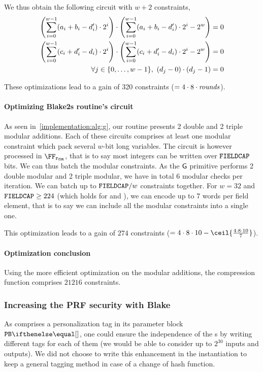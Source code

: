 We thus obtain the following circuit with $w+2$ constraints,
\begin{align*}
  \left ( \sum_{i=0}^{w - 1} ( a_i + b_i - d'_i ) \cdot 2^i \right ) \cdot \left ( \sum_{i=0}^{w - 1} ( a_i + b_i - d'_i ) \cdot 2^i - 2^w \right ) &= 0 \\
  \left ( \sum_{i=0}^{w - 1} ( c_i + d'_i - d_i ) \cdot 2^i \right ) \cdot \left ( \sum_{i=0}^{w - 1} ( c_i + d'_i - d_i ) \cdot 2^i - 2^w \right ) &= 0 \\
  \forall j \in \{{0},\ldots,{w - 1}\},\ (d_j - 0) \cdot (d_j - 1 ) &= 0
\end{align*}

These optimizations lead to a gain of 320 constraints ($=4 \cdot 8 \cdot \mathit{rounds}$).

\paragraph{Optimizing Blake2s routine's circuit}\label{implementation:efficiency:blake:optimization:batch-constraints}

As seen in~\cref{implementation:alg:g}, our routine presents 2 double and 2 triple modular additions. Each of these circuits comprises at least one modular constraint which pack several $w$-bit long variables.
The circuit is however processed in $\FFx{\rCURVE}$, that is to say most integers can be written over $\mathtt{FIELDCAP}$ bits. We can thus batch the modular constraints.
As the $\mathsf{G}$ primitive performs 2 double modular and 2 triple modular, we have in total 6 modular checks per iteration. We can batch up to $\mathtt{FIELDCAP} / w$ constraints together. For $w=32$ and $\mathtt{FIELDCAP} \geq 224$ (which holds for \BNCurve and \BLSCurve), we can encode up to 7 words per field element, that is to say we can include all the modular constraints into a single one.

This optimization leads to a gain of $274$ constraints ($= 4\cdot8\cdot10-\ceil{\frac{4\cdot8\cdot10}{7}}$).

\paragraph{Optimization conclusion}\label{implementation:efficiency:blake:optimization:conclusion}

Using the more efficient optimization on the modular additions, the  compression function comprises $21216$ constraints.

\subsubsection{Increasing the PRF security with Blake}\label{implementation:efficiency:blake-prf}

As  comprises a personalization tag in its parameter block $\blakePB{}$, one could ensure the independence of the \prf{}s by writing different tags for each of them (we would be able to consider up to $2^{30}$ inputs and outputs).
We did not choose to write this enhancement in the instantiation to keep a general tagging method in case of a change of hash function.

